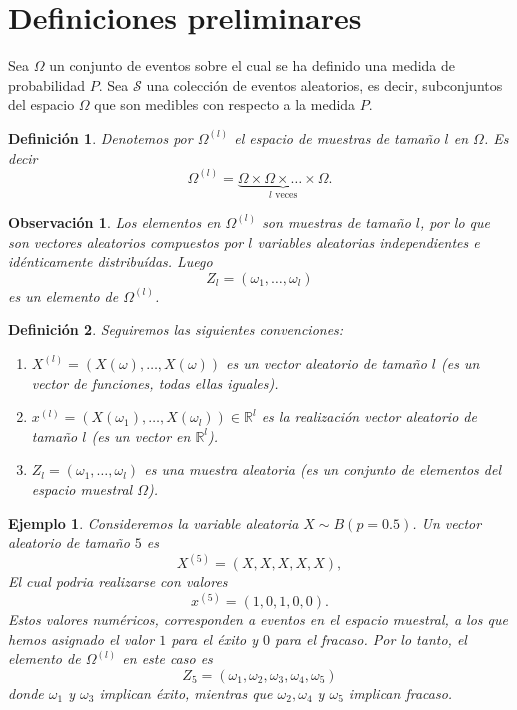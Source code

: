 \documentclass{report}
\newtheorem{dfn}{Definición}[section]
\newtheorem{obs}{Observación}[section]
\newtheorem{ej}{Ejemplo}[section]
\begin{document}
\section{Definiciones preliminares}

Sea \( \Omega \) un conjunto de eventos sobre el cual se ha definido una medida de probabilidad \( P \). Sea \( \mathcal{S} \) una colección de eventos 
aleatorios, es decir, subconjuntos del espacio \( \Omega \) que son medibles con respecto 
a la medida \( P \). \newline
\begin{dfn}
    Denotemos por \( \Omega^{(l)} \) el espacio de muestras de tamaño \( l \) en \( \Omega \). Es decir
    \[ \Omega^{(l)} = \underbrace{\Omega \times \Omega \times \ldots \times \Omega}_{l \text{ veces}}. \]
\end{dfn}

\begin{obs}
Los elementos en  \( \Omega^{(l)} \) son muestras de tamaño $l$, por lo que son vectores
aleatorios compuestos por $l$ variables aleatorias independientes e idénticamente distribuídas.
Luego
$$
Z_l = (\omega_1, \ldots, \omega_l)
$$
es un elemento de \( \Omega^{(l)} \).
\end{obs}

\begin{dfn}
Seguiremos las siguientes convenciones:
\begin{enumerate}
    \item $X^{(l)} = (X(\omega),\ldots,X(\omega))$ es un vector aleatorio de tamaño $l$ (es un vector de funciones, todas ellas iguales).
    \item $x^{(l)} = (X(\omega_1),\ldots,X(\omega_l)) \in \mathbb{R}^l$ es la realización vector aleatorio de tamaño $l$ (es un vector en $\mathbb{R}^l$).
    \item $Z_l = (\omega_1,\ldots,\omega_l)$ es una muestra aleatoria (es un conjunto de elementos del espacio muestral $\Omega$).
\end{enumerate}
\end{dfn}

\begin{ej}
    Consideremos la variable aleatoria $X\sim B(p=0.5)$. Un vector aleatorio de tamaño $5$ es
    $$
    X^{(5)} = (X,X,X,X,X),
    $$
    El cual podria realizarse con valores
    $$
    x^{(5)} = (1,0,1,0,0).
    $$
    Estos valores numéricos, corresponden a eventos en el espacio muestral, a los que hemos asignado el valor $1$
    para el éxito y $0$ para el fracaso. Por lo tanto, el elemento de $\Omega^{(l)}$ en este caso es
    $$
    Z_{5}=(\omega_1, \omega_2, \omega_3, \omega_4, \omega_5)
    $$
    donde $\omega_1$ y $\omega_3$ implican éxito, mientras que $\omega_2, \omega_4$ y $\omega_5$ implican fracaso.
\end{ej}
\end{document}
